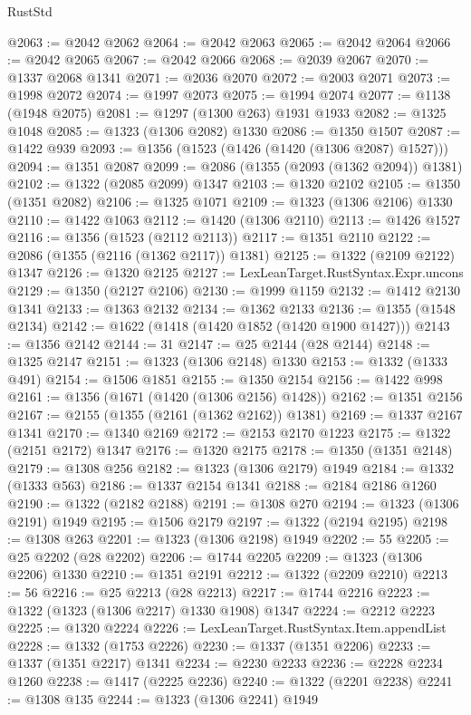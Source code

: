 \begin{lexlean}{RustStd}
\begin{coremodule}
@2063 := @2042 @2062
@2064 := @2042 @2063
@2065 := @2042 @2064
@2066 := @2042 @2065
@2067 := @2042 @2066
@2068 := @2039 @2067
@2070 := @1337 @2068 @1341
@2071 := @2036 @2070
@2072 := @2003 @2071
@2073 := @1998 @2072
@2074 := @1997 @2073
@2075 := @1994 @2074
@2077 := @1138 (@1948 @2075)
@2081 := @1297 (@1300 @263) @1931 @1933
@2082 := @1325 @1048
@2085 := @1323 (@1306 @2082) @1330
@2086 := @1350 @1507
@2087 := @1422 @939
@2093 := @1356 (@1523 (@1426 (@1420 (@1306 @2087) @1527)))
@2094 := @1351 @2087
@2099 := @2086 (@1355 (@2093 (@1362 @2094)) @1381)
@2102 := @1322 (@2085 @2099) @1347
@2103 := @1320 @2102
@2105 := @1350 (@1351 @2082)
@2106 := @1325 @1071
@2109 := @1323 (@1306 @2106) @1330
@2110 := @1422 @1063
@2112 := @1420 (@1306 @2110)
@2113 := @1426 @1527
@2116 := @1356 (@1523 (@2112 @2113))
@2117 := @1351 @2110
@2122 := @2086 (@1355 (@2116 (@1362 @2117)) @1381)
@2125 := @1322 (@2109 @2122) @1347
@2126 := @1320 @2125
@2127 := LexLeanTarget.RustSyntax.Expr.uncons
@2129 := @1350 (@2127 @2106)
@2130 := @1999 @1159
@2132 := @1412 @2130 @1341
@2133 := @1363 @2132
@2134 := @1362 @2133
@2136 := @1355 (@1548 @2134)
@2142 := @1622 (@1418 (@1420 @1852 (@1420 @1900 @1427)))
@2143 := @1356 @2142
@2144 := 31
@2147 := @25 @2144 (@28 @2144)
@2148 := @1325 @2147
@2151 := @1323 (@1306 @2148) @1330
@2153 := @1332 (@1333 @491)
@2154 := @1506 @1851
@2155 := @1350 @2154
@2156 := @1422 @998
@2161 := @1356 (@1671 (@1420 (@1306 @2156) @1428))
@2162 := @1351 @2156
@2167 := @2155 (@1355 (@2161 (@1362 @2162)) @1381)
@2169 := @1337 @2167 @1341
@2170 := @1340 @2169
@2172 := @2153 @2170 @1223
@2175 := @1322 (@2151 @2172) @1347
@2176 := @1320 @2175
@2178 := @1350 (@1351 @2148)
@2179 := @1308 @256
@2182 := @1323 (@1306 @2179) @1949
@2184 := @1332 (@1333 @563)
@2186 := @1337 @2154 @1341
@2188 := @2184 @2186 @1260
@2190 := @1322 (@2182 @2188)
@2191 := @1308 @270
@2194 := @1323 (@1306 @2191) @1949
@2195 := @1506 @2179
@2197 := @1322 (@2194 @2195)
@2198 := @1308 @263
@2201 := @1323 (@1306 @2198) @1949
@2202 := 55
@2205 := @25 @2202 (@28 @2202)
@2206 := @1744 @2205
@2209 := @1323 (@1306 @2206) @1330
@2210 := @1351 @2191
@2212 := @1322 (@2209 @2210)
@2213 := 56
@2216 := @25 @2213 (@28 @2213)
@2217 := @1744 @2216
@2223 := @1322 (@1323 (@1306 @2217) @1330 @1908) @1347
@2224 := @2212 @2223
@2225 := @1320 @2224
@2226 := LexLeanTarget.RustSyntax.Item.appendList
@2228 := @1332 (@1753 @2226)
@2230 := @1337 (@1351 @2206)
@2233 := @1337 (@1351 @2217) @1341
@2234 := @2230 @2233
@2236 := @2228 @2234 @1260
@2238 := @1417 (@2225 @2236)
@2240 := @1322 (@2201 @2238)
@2241 := @1308 @135
@2244 := @1323 (@1306 @2241) @1949

\end{coremodule}
\end{lexlean}
